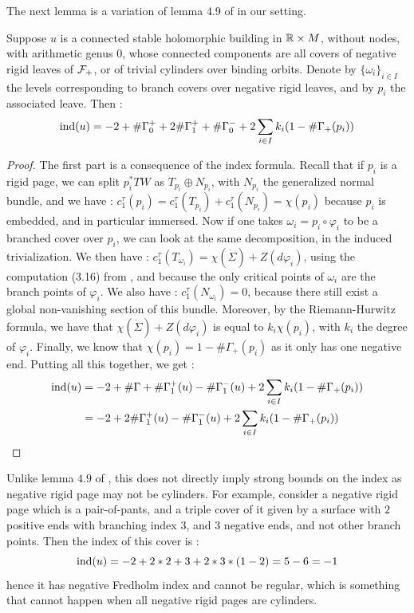 \documentclass[../main.tex]{subfiles}
\begin{document}
The next lemma is a variation of lemma 4.9 of \cite{SOBD2} in our setting.


\begin{lemma}
Suppose $u$ is a connected stable holomorphic building in $\mathbb{R}\times M$, without nodes, with arithmetic genus $0$, whose connected components are all covers of negative rigid leaves of $\mathcal{F}_+$, or of trivial cylinders over binding orbits. Denote by $\{\omega_i\}_{i\in I}$ the levels corresponding to branch covers over negative rigid leaves, and by $p_i$ the associated leave. Then :
$$\text{ind}(u) = - 2 + \#\Gamma_0 ^+ + 2\#\Gamma_1^+ + \#\Gamma_0^- + 2\sum_{i\in I}k_i(1-\#\Gamma_+(p_i))$$
\end{lemma}

\begin{proof}
The first part is a consequence of the index formula. Recall that if $p_i$  is a rigid page, we can split $p_i^*TW$ as $T_{p_i}\oplus N_{p_i}$, with $N_{p_i}$ the generalized normal bundle, and we have : $c_1^\tau(p_i) = c_1^\tau(T_{p_i}) + c_1^{\tau}(N_{p_i}) = \chi(p_i)$ because $p_i$ is embedded, and in particular immersed. Now if one takes $\omega_i = p_i\circ \varphi_i$ to be a branched cover over $p_i$, we can look at the same decomposition, in the induced trivialization. We then have : $c_1^{\tau}(T_{\omega_i})= \chi(\dot\Sigma) + Z(d\varphi_i)$, using the computation (3.16) from \cite{wendl_automatic_2009}, and because the only critical points of $\omega_i$ are the branch points of $\varphi_i$. We also have : $c_1^\tau(N_{\omega_i}) = 0$, because there still exist a global non-vanishing section of this bundle. Moreover, by the Riemann-Hurwitz formula, we have that $\chi(\dot\Sigma) + Z(d\varphi_i)$ is equal to $k_i\chi(p_i)$, with $k_i$ the degree of $\varphi_i$. Finally, we know that $\chi(p_i) = 1- \#\Gamma_+(p_i)$ as it only has one negative end. Putting all this together, we get : 
\begin{align*}
\text{ind}(u) &= - 2 + \#\Gamma + \#\Gamma_1^+(u) - \#\Gamma_1^-(u) + 2\sum_{i\in I}k_i(1-\#\Gamma_+(p_i))\\
&= -2 + 2\#\Gamma_1^+(u) - \#\Gamma_1^-(u) + 2\sum_{i\in I}k_i(1 - \#\Gamma_+(p_i))
\end{align*}
\end{proof}

\begin{remark}
Unlike lemma $4.9$ of \cite{SOBD2}, this does not directly imply strong bounds on the index as negative rigid page may not be cylinders. For example, consider a negative rigid page which is a pair-of-pants, and a triple cover of it given by a surface with $2$ positive ends with branching index $3$, and $3$ negative ends, and not other branch points. Then the index of this cover is : $$\text{ind}(u) = -2 + 2*2 + 3 + 2*3*(1-2) = 5 - 6 = -1$$
hence it has negative Fredholm index and cannot be regular, which is something that cannot happen when all negative rigid pages are cylinders.
\end{remark}
\end{document}
